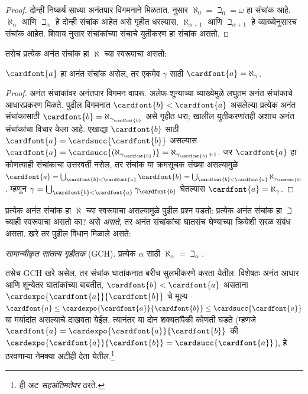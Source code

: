 \documentclass[../../../include/open-logic-section]{subfiles}
\begin{document}
\begin{proof}
दोन्ही निष्कर्ष साध्या अनंतपार विगमनाने मिळतात.  नुसार $\aleph_0 =
\beth_0 = \omega$ हा संचांक आहे. $\aleph_\alpha$ आणि $\beth_\alpha$ हे दोन्ही संचांक आहेत असे गृहीत धरल्यास, $\aleph_{\alpha+1}$ आणि $\beth_{\alpha+1}$ हे व्याख्येनुसारच संचांक आहेत. शिवाय  नुसार संचांकांच्या संचाचे युतीकरण हा संचांक असतो.
\end{proof}
\noindent
तसेच प्रत्येक अनंत संचांक हा $\aleph$ च्या स्वरूपाचा असतो:

\begin{prop}
$\cardfont{a}$ हा अनंत संचांक असेल, तर एकमेव $\gamma$ साठी $\cardfont{a} =
\aleph_\gamma$.
\end{prop}

\begin{proof}
अनंत संचांकांवर अनंतपार विगमन वापरू. अलेफ-शून्याच्या व्याख्येमुळे लघुतम अनंत संचांकाचे आधारप्रकरण मिळते. पुढील विगमनात $\cardfont{b} < \cardfont{a}$ असलेल्या प्रत्येक अनंत संचांकासाठी $\cardfont{b} =
\aleph_{\gamma_\cardfont{b}}$ असे गृहीत धरा; खालील युतीकरणांतही अशाच अनंत संचांकांचा विचार केला आहे. एखाद्या $\cardfont{b}$ साठी $\cardfont{a} =
\cardsucc{\cardfont{b}}$ असल्यास $\cardfont{a} =
\cardsucc{(\aleph_{\gamma_\cardfont{b}})}=
\aleph_{\gamma_\cardfont{b}+1}$. जर $\cardfont{a}$ हा कोणत्याही संचांकाचा उत्तरवर्ती नसेल, तर संचांक या क्रमसूचक संख्या असल्यामुळे $\cardfont{a} = \bigcup_{\cardfont{b} < \cardfont{a}} \cardfont{b} =
\bigcup_{\cardfont{b} < \cardfont{a}}{\aleph_{\gamma_\cardfont{b}}}$.
म्हणून $\gamma =
\bigcup_{\cardfont{b} < \cardfont{a}}\gamma_\cardfont{b}$ घेतल्यास $\cardfont{a} = \aleph_\gamma$.
\end{proof}

प्रत्येक अनंत संचांक हा $\aleph$ च्या स्वरूपाचा असल्यामुळे पुढील प्रश्न पडतो: प्रत्येक अनंत संचांक हा $\beth$ च्याही स्वरूपाचा असतो का? असे \emph{असते}, तर अनंत संचांकांचा घातसंच घेण्याच्या क्रियेशी सरळ संबंध असता. खरे तर पुढील विधान मिळाले असते:

\begin{defish}
\emph{सामान्यीकृत सांतत्य गृहीतक} (GCH). प्रत्येक $\alpha$ साठी $\aleph_\alpha = \beth_\alpha$.
\end{defish}

तसेच GCH खरे असेल, तर संचांक घातांकनात बरीच सुलभीकरणे करता येतील. विशेषतः अनंत आधार आणि शून्येतर घातांकांच्या बाबतीत, $\cardfont{b} < \cardfont{a}$ असताना $\cardexpo{\cardfont{a}}{\cardfont{b}}$ चे मूल्य
$\cardfont{a}\leq \cardexpo{\cardfont{a}}{\cardfont{b}} \leq
\cardsucc{\cardfont{a}}$ या मर्यादांत असल्याचे दाखवता येईल. त्यानंतर या दोन शक्यतांपैकी कोणती घडते (म्हणजे $\cardfont{a} = \cardexpo{\cardfont{a}}{\cardfont{b}}$ की $\cardexpo{\cardfont{a}}{\cardfont{b}} =
\cardsucc{\cardfont{a}}$), हे ठरवणाऱ्या नेमक्या अटीही देता येतील.\footnote{ही अट \emph{सहअंतिमतेवर} ठरते.}
\end{document}
